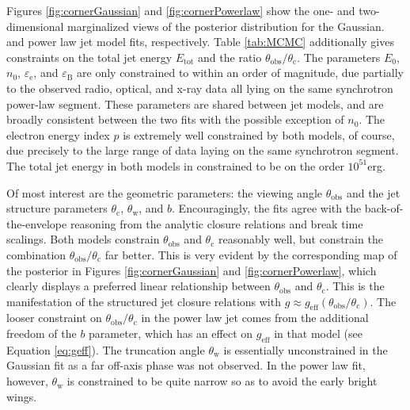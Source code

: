 \documentclass[twocolumn]{aastex62}
\newcommand{\gwbns}{GW170817A}
\newcommand{\thobs}{\ensuremath{\theta_{\mathrm{obs}}}}
\newcommand{\thW}{\ensuremath{\theta_{\mathrm{w}}}}
\newcommand{\thC}{\ensuremath{\theta_{\mathrm{c}}}}
\newcommand{\epse}{\ensuremath{\varepsilon_{\mathrm{e}}}}
\newcommand{\epsB}{\ensuremath{\varepsilon_{\mathrm{B}}}}
\newcommand{\Etot}{\ensuremath{E_{\mathrm{tot}}}}
\newcommand{\geff}{\ensuremath{g_{\mathrm{eff}}}}
\begin{document}
\begin{figure*}
	\caption{Views of the posterior parameter distribution for a power law jet fit to the \gwbns{} afterglow.  The diagonal contains one-dimensional marginalized posteriors for each fit parameter, while the off-diagonal plots contain two-dimensional maps of the posterior marginalized over all but the two corresponding parameters. \label{fig:cornerPowerlaw}}
\end{figure*}

Figures \ref{fig:cornerGaussian} and \ref{fig:cornerPowerlaw} show the one- and two-dimensional marginalized views of the posterior distribution for the Gaussian. and power law jet model fits, respectively.  Table \ref{tab:MCMC} additionally gives constraints on the total jet energy \Etot{} and the ratio $\thobs/\thC$. The parameters $E_0$, $n_0$, $\epse$, and $\epsB$ are only constrained to within an order of magnitude, due partially to the observed radio, optical, and x-ray data all lying on the same synchrotron power-law segment.  These parameters are shared between jet models, and are broadly consistent between the two fits with the possible exception of $n_0$.  The electron energy index $p$ is extremely well constrained by both models, of course, due precisely to the large range of data laying on the same synchrotron segment.  The total jet energy in both models in constrained to be on the order $10^{51}$erg.

Of most interest are the geometric parameters: the viewing angle $\thobs$ and the jet structure parameters $\thC$, $\thW$, and $b$.  Encouragingly, the fits agree with the back-of-the-envelope reasoning from the analytic closure relations and break time scalings.  Both models constrain $\thobs$ and $\thC$ reasonably well, but constrain the combination $\thobs/\thC$ far better.  This is very evident by the corresponding map of the posterior in Figures \ref{fig:cornerGaussian} and \ref{fig:cornerPowerlaw}, which clearly displays a preferred linear relationship between $\thobs$ and $\thC$.  This is the manifestation of the structured jet closure relations with $g \approx \geff(\thobs/\thC)$.  The looser constraint on $\thobs/\thC$ in the power law jet comes from the additional freedom of the $b$ parameter, which has an effect on $\geff$ in that model (see Equation \eqref{eq:geff}). The truncation angle $\thW$ is essentially unconstrained in the Gaussian fit as a far off-axis phase was not observed.  In the power law fit, however, $\thW$ is constrained to be quite narrow so as to avoid the early bright wings.
\end{document}
